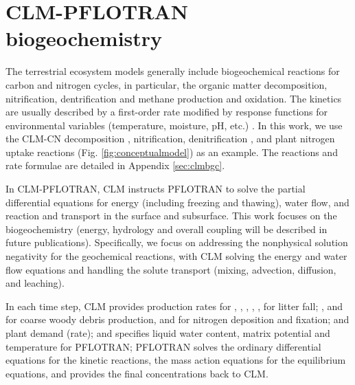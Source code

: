 \documentclass[gmd, manuscript]{copernicus}
\begin{document}
\section{CLM-PFLOTRAN biogeochemistry}
The terrestrial ecosystem models generally include biogeochemical reactions for
carbon and nitrogen cycles, in particular, the organic matter decomposition,
nitrification, dentrification and methane production and oxidation. The
kinetics are usually described by a first-order rate modified by response
functions for environmental variables (temperature, moisture, pH, etc.)
\citep{Bonan2012,Boyer2006,Schmidt2011}.  In this work, we use the CLM-CN
decomposition \citep{Bonan2012,Oleson2013,Thornton2005}, nitrification,
denitrification \citep{Dickinson2002,Parton2001,Parton1996}, and plant nitrogen
uptake reactions (Fig. \ref{fig:conceptualmodel}) as an example. The reactions
and rate formulae are detailed in Appendix \ref{sec:clmbgc}.


In CLM-PFLOTRAN, CLM instructs PFLOTRAN to solve the partial differential
equations for energy (including freezing and thawing), water flow, and reaction
and transport in the surface and subsurface. This work focuses on the
biogeochemistry (energy, hydrology and overall coupling will be described in
future publications). Specifically, we focus on addressing the nonphysical
solution negativity for the geochemical reactions, with CLM solving the energy and water
flow equations and handling the solute transport (mixing, advection, diffusion,
and leaching).

In each time step, CLM provides production rates for ,
, , , ,  for litter
fall; , and  for coarse woody debris production,
 and  for nitrogen deposition and fixation; and
plant  demand (rate); and specifies liquid water content, matrix
potential and temperature for PFLOTRAN; PFLOTRAN solves the ordinary differential
equations for the kinetic reactions, the mass action equations for the
equilibrium equations, and provides the final concentrations back
to CLM.   
\end{document}
